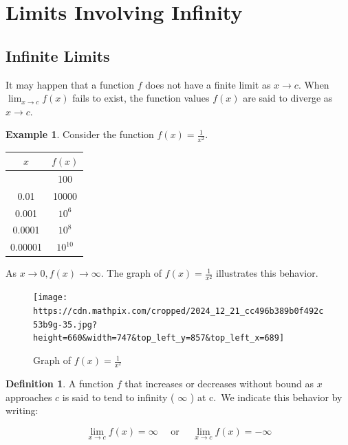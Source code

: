 \documentclass[
]{book}
\theoremstyle{definition}
\newtheorem{definition}{Definition}[chapter]
\theoremstyle{definition}
\newtheorem{example}{Example}[chapter]
\theoremstyle{definition}
\theoremstyle{definition}
\theoremstyle{remark}
\begin{document}
\section{Limits Involving Infinity}\label{limits-involving-infinity}

\subsection{Infinite Limits}\label{infinite-limits}

It may happen that a function \(f\) does not have a finite limit as \(x \rightarrow c\). When \(\lim _{x \rightarrow c} f(x)\) fails to exist, the function values \(f(x)\) are said to diverge as \(x \rightarrow c\).

\begin{example}
\protect\hypertarget{exm:unnamed-chunk-30}{}\label{exm:unnamed-chunk-30}Consider the function \(f(x)=\frac{1}{x^{2}}\).

\begin{longtable}[]{@{}cc@{}}
\toprule\noalign{}
\(x\) & \(f(x)\) \\
\midrule\noalign{}
\endhead
\bottomrule\noalign{}
\endlastfoot
0.1 & 100 \\
0.01 & 10000 \\
0.001 & \(10^{6}\) \\
0.0001 & \(10^{8}\) \\
0.00001 & \(10^{10}\) \\
\end{longtable}

As \(x \rightarrow 0, f(x) \rightarrow \infty\). The graph of \(f(x)=\frac{1}{x^{2}}\) illustrates this behavior.
\end{example}

\begin{figure}
\centering
\texttt{[image: https://cdn.mathpix.com/cropped/2024\_12\_21\_cc496b389b0f492c53b9g-35.jpg?height=660\&width=747\&top\_left\_y=857\&top\_left\_x=689]}
\caption{Graph of \(f(x)=\frac{1}{x^{2}}\)}
\end{figure}

\begin{definition}
\protect\hypertarget{def:unnamed-chunk-31}{}\label{def:unnamed-chunk-31}A function \(f\) that increases or decreases without bound as \(x\) approaches \(c\) is said to tend to infinity ( \(\infty\) ) at c.~We indicate this behavior by writing:

\[
\lim _{x \rightarrow c} f(x)=\infty \quad \text { or } \quad \lim _{x \rightarrow c} f(x)=-\infty
\]
\end{definition}
\end{document}
